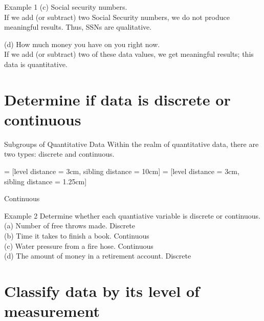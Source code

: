 \documentclass[t]{beamer}
\begin{document}
\begin{frame}{Example 1}
(c) \quad Social security numbers.	\newline\\
If we add (or subtract) two Social Security numbers, we do not produce meaningful results. Thus, SSNs are qualitative.	\newline\\	\pause

(d) \quad How much money you have on you right now. \newline\\	\pause
If we add (or subtract) two of these data values, we get meaningful results; this data is quantitative.
\end{frame}

\section{Determine if data is discrete or continuous}

\begin{frame}{Subgroups of Quantitative Data}
Within the realm of quantitative data, there are two types: discrete and continuous.	\newline\\	\pause
\begin{center}
 = [level distance = 3cm, sibling distance = 10cm]
 = [level distance = 3cm, sibling distance = 1.25cm]
\end{center}
Continuous 
\end{frame}

\begin{frame}{Example 2}
Determine whether each quantiative variable is discrete or continuous.	\newline\\	
(a)	\quad Number of free throws made.	\quad	\pause
Discrete \newline\\ \pause
(b) \quad Time it takes to finish a book. \quad \pause
Continuous \newline\\ \pause
(c) \quad Water pressure from a fire hose. \quad \pause
Continuous \newline\\ \pause
(d) \quad The amount of money in a retirement account. \quad \pause Discrete
\end{frame}

\section{Classify data by its level of measurement}

\end{document}
